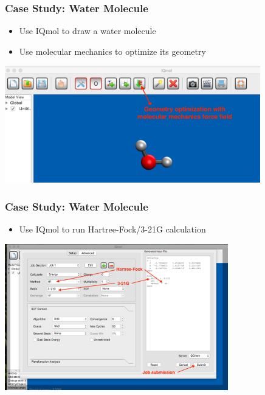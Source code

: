 \documentclass[handout]{beamer} %
\begin{document}
\begin{frame}
\frametitle{Case Study: Water Molecule}
\begin{itemize}
\item Use IQmol to draw a water molecule
\item Use molecular mechanics to optimize its geometry 
\end{itemize}
\begin{center}
\includegraphics[height=2.0in]{figures/iqmol-water.png}
\end{center}
\end{frame}

\begin{frame}
\frametitle{Case Study: Water Molecule}
\begin{itemize}
\item Use IQmol to run Hartree-Fock/3-21G calculation
\end{itemize}
\begin{center}
\includegraphics[height=2.5in]{figures/iqmol-water2.png}
\end{center}
\end{frame}
\end{document}
